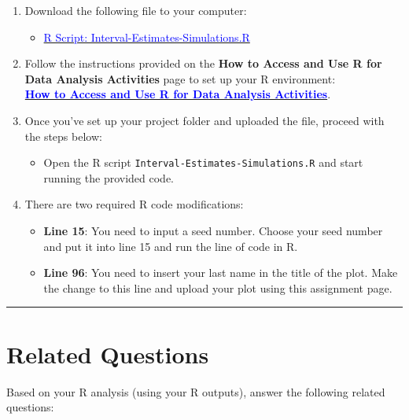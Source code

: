 \documentclass[oneside,openany]{book}
\providecommand{\tightlist}{%
  \setlength{\itemsep}{0pt}\setlength{\parskip}{0pt}}
\begin{document}
\begin{enumerate}
\def\labelenumi{\arabic{enumi}.}
\item
  Download the following file to your computer:

  \begin{itemize}
  \tightlist
  \item
    \href{https://raw.githubusercontent.com/aslemand/Data-Analysis-Activities/main/data/Activity_5/Interval-Estimates-Simulations.R}{\textcolor{blue}{R Script: Interval-Estimates-Simulations.R}}
  \end{itemize}
\item
  Follow the instructions provided on the \textbf{How to Access and Use R for Data Analysis Activities} page to set up your R environment:\\
  \hyperref[how-to-set-up-r-for-data-analysis-activities]{\textcolor{blue}{\textbf{How to Access and Use R for Data Analysis Activities}}}.
\item
  Once you've set up your project folder and uploaded the file, proceed with the steps below:

  \begin{itemize}
  \tightlist
  \item
    Open the R script \texttt{Interval-Estimates-Simulations.R} and start running the provided code.
  \end{itemize}
\item
  There are two required R code modifications:

  \begin{itemize}
  \tightlist
  \item
    \textbf{Line 15}: You need to input a seed number. Choose your seed number and put it into line 15 and run the line of code in R.
  \item
    \textbf{Line 96}: You need to insert your last name in the title of the plot. Make the change to this line and upload your plot using this assignment page.
  \end{itemize}
\end{enumerate}

\begin{center}\rule{0.5\linewidth}{0.5pt}\end{center}

\section{Related Questions}\label{related-questions-4}

Based on your R analysis (using your R outputs), answer the following related questions:
\end{document}
